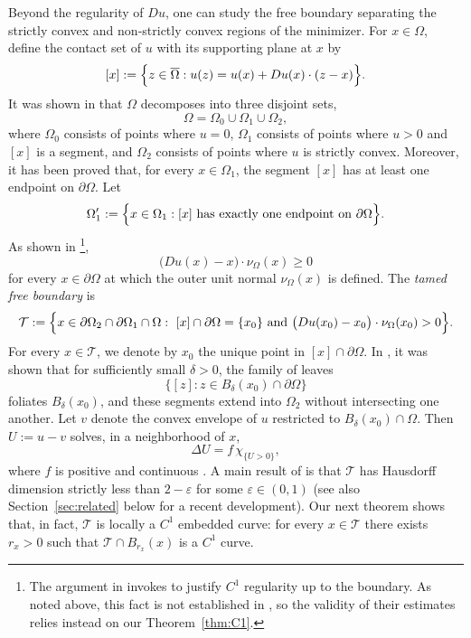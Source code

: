 \documentclass[reqno,11pt]{amsart}
\numberwithin{equation}{section}
\theoremstyle{remark}
\begin{document}
Beyond the regularity of $Du$, one can study the free boundary separating the strictly convex and
non-strictly convex regions of the minimizer.
For $x\in\Omega$, define the contact set of $u$ with its supporting plane at $x$ by
\[
[x]
:=
\Bigl\{
z\in\overline\Omega:
u(z)=u(x)+Du(x)\cdot(z-x)
\Bigr\}.
\]
It was shown in \cite{MRZ20252} that $\Omega$ decomposes into three disjoint sets,
\[
\Omega=\Omega_0\cup\Omega_1\cup\Omega_2,
\]
where $\Omega_0$ consists of points where $u=0$, $\Omega_1$ consists of points where $u>0$ and $[x]$
is a segment, and $\Omega_2$ consists of points where $u$ is strictly convex.
Moreover, it has been proved that, for every $x\in\Omega_1$, the segment $[x]$ has at least one endpoint on $\partial\Omega$.
Let
\[
\Omega_1'
:=
\Bigl\{
x\in\Omega_1:
[x]\ \text{has exactly one endpoint on }\partial\Omega
\Bigr\}.
\]
As shown in \cite{MRZ20252}\footnote{The argument in \cite{MRZ20252} invokes \cite{CL2001} to justify $C^1$ regularity up to the boundary. As noted above, this fact is not established in \cite{CL2001}, so the validity of their estimates relies instead on our Theorem~\ref{thm:C1}.},
\[
\bigl(Du(x)-x\bigr)\cdot \nu_{\Omega}(x)\ge 0
\]
for every $x\in\partial\Omega$ at which the outer unit normal $\nu_\Omega(x)$ is defined.
The \emph{tamed free boundary} is
\begin{equation}\label{tamefree}
\mathcal{T}
:=
\Bigl\{
x\in \partial\Omega_2\cap\partial\Omega_1\cap\Omega
:\ [x]\cap\partial\Omega=\{x_0\}
\ \text{and}\
\bigl(Du(x_0)-x_0\bigr)\cdot\nu_\Omega(x_0)>0
\Bigr\}.
\end{equation}
For every $x\in\mathcal T$, we denote by $x_0$ the unique point in $[x]\cap\partial\Omega$.
In \cite{MRZ20252}, it was shown that for sufficiently small $\delta>0$, the family of leaves
\[
\{[z]: z\in B_\delta(x_0)\cap\partial\Omega\}
\]
foliates $B_\delta(x_0)$, and these segments extend into $\Omega_2$ without intersecting one another.
Let $v$ denote the convex envelope of $u$ restricted to $B_\delta(x_0)\cap\Omega$.
Then $U:=u-v$ solves, in a neighborhood of $x$,
\[
\Delta U=f\,\chi_{\{U>0\}},
\]
where $f$ is positive and continuous \cite{MRZ20252}.
A main result of \cite{MRZ20252} is that $\mathcal{T}$ has Hausdorff dimension strictly less than $2-\varepsilon$ for some $\varepsilon\in(0,1)$ (see also Section~\ref{sec:related} below for a recent development).
Our next theorem shows that, in fact, $\mathcal{T}$ is locally a $C^1$ embedded curve: for every $x \in \mathcal{T}$ there exists $r_x>0$ such that $\mathcal{T}\cap B_{r_x}(x)$ is a $C^1$ curve.
\end{document}
